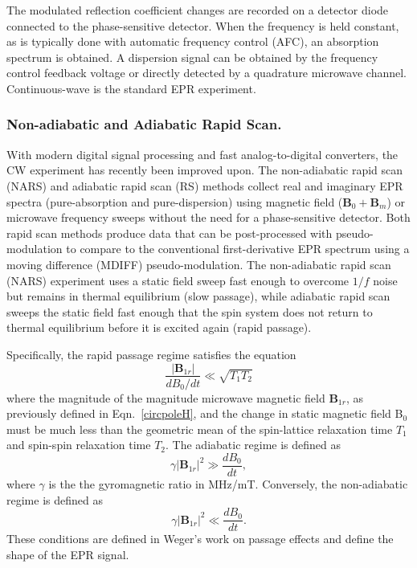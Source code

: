 The modulated reflection coefficient changes are recorded on a detector diode connected to the phase-sensitive detector. When the frequency is held constant, as is typically done with automatic frequency control (AFC), an absorption spectrum is obtained. \cite{poole1967electron} A dispersion signal can be obtained by the frequency control feedback voltage or directly detected by a quadrature microwave channel. Continuous-wave is the standard EPR experiment. 

\subsubsection*{Non-adiabatic and Adiabatic Rapid Scan.}
With modern digital signal processing and fast analog-to-digital converters, the CW experiment has recently been improved upon. The non-adiabatic rapid scan (NARS) \cite{KITTELL2011228, KITTELL201251, KITTELL201568, Hyde2013MDIFF, YU201558} and adiabatic rapid scan (RS) \cite{JOSHI200544,TSEITLIN200948, MITCHELL2012221, RScompare,MOSER2017} methods collect real and imaginary EPR spectra (pure-absorption and pure-dispersion) using magnetic field ($\mathbf{B}_0 + \mathbf{B}_m $) or microwave frequency sweeps without the need for a phase-sensitive detector. Both rapid scan methods produce data that can be post-processed with pseudo-modulation to compare to the conventional first-derivative EPR spectrum using a moving difference (MDIFF) pseudo-modulation. \cite{Hyde2013MDIFF} The non-adiabatic rapid scan (NARS) experiment uses a static field sweep fast enough to overcome $1/f$ noise but remains in thermal equilibrium (slow passage), while adiabatic rapid scan sweeps the static field fast enough that the spin system does not return to thermal equilibrium before it is excited again (rapid passage). \cite{Weger1960} 

Specifically, the rapid passage regime satisfies the equation
\begin{equation}
    \frac{|\mathbf{B}_{1r}|}{d B_0/dt} \ll \sqrt{T_1 T_2}
\end{equation}
where the magnitude of the magnitude microwave magnetic field $\mathbf{B}_{1r}$, as previously defined in Eqn.~\ref{circpoleH}, and the change in static magnetic field B$_0$ must be much less than the geometric mean of the spin-lattice relaxation time $T_1$ and spin-spin relaxation time $T_2$. The adiabatic regime is defined as 
\begin{equation}
    \gamma |\mathbf{B}_{1r}|^2 \gg \frac{d B_0}{dt},
\end{equation}
where $\gamma$ is the the gyromagnetic ratio in MHz/mT. Conversely, the non-adiabatic regime is defined as
\begin{equation}
    \gamma |\mathbf{B}_{1r}|^2 \ll \frac{d B_0}{dt}.
\end{equation}
These conditions are defined in Weger's work on passage effects and define the shape of the EPR signal. \cite{Weger1960}

